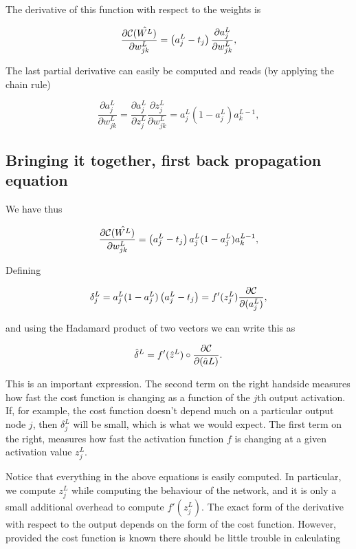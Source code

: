 \documentclass[11pt]{article}
\begin{document}
    The derivative of this function with respect to the weights is

    \[
\frac{\partial{\cal C}(\hat{W^L})}{\partial w_{jk}^L}  =  \left(a_j^L - t_j\right)\frac{\partial a_j^L}{\partial w_{jk}^{L}},
\]

    The last partial derivative can easily be computed and reads (by
applying the chain rule)

    \[
\frac{\partial a_j^L}{\partial w_{jk}^{L}} = \frac{\partial a_j^L}{\partial z_{j}^{L}}\frac{\partial z_j^L}{\partial w_{jk}^{L}}=a_j^L(1-a_j^L)a_k^{L-1},
\]

    \hypertarget{bringing-it-together-first-back-propagation-equation}{%
\subsection{Bringing it together, first back propagation
equation}\label{bringing-it-together-first-back-propagation-equation}}

We have thus

    \[
\frac{\partial{\cal C}(\hat{W^L})}{\partial w_{jk}^L}  =  \left(a_j^L - t_j\right)a_j^L(1-a_j^L)a_k^{L-1},
\]

    Defining

    \[
\delta_j^L = a_j^L(1-a_j^L)\left(a_j^L - t_j\right) = f'(z_j^L)\frac{\partial {\cal C}}{\partial (a_j^L)},
\]

    and using the Hadamard product of two vectors we can write this as

    \[
\hat{\delta}^L = f'(\hat{z}^L)\circ\frac{\partial {\cal C}}{\partial (\hat{a}L)}.
\]

    This is an important expression. The second term on the right handside
measures how fast the cost function is changing as a function of the
\(j\)th output activation. If, for example, the cost function doesn't
depend much on a particular output node \(j\), then \(\delta_j^L\) will
be small, which is what we would expect. The first term on the right,
measures how fast the activation function \(f\) is changing at a given
activation value \(z_j^L\).

Notice that everything in the above equations is easily computed. In
particular, we compute \(z_j^L\) while computing the behaviour of the
network, and it is only a small additional overhead to compute
\(f'(z^L_j)\). The exact form of the derivative with respect to the
output depends on the form of the cost function. However, provided the
cost function is known there should be little trouble in calculating
\end{document}
